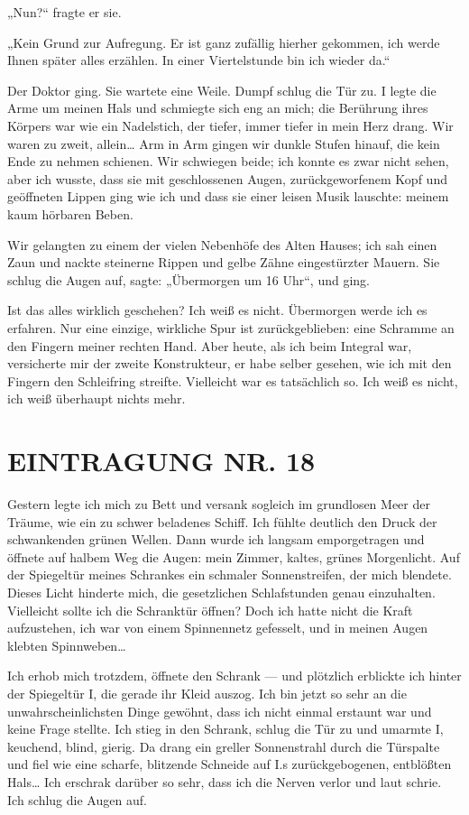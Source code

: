 „Nun?“ fragte er sie.

„Kein Grund zur Aufregung. Er ist ganz zufällig hierher gekommen,
ich werde Ihnen später alles erzählen. In einer Viertelstunde bin
ich wieder da.“

Der Doktor ging. Sie wartete eine Weile. Dumpf schlug die Tür zu. I
legte die Arme um meinen Hals und schmiegte sich eng an mich; die
Berührung ihres Körpers war wie ein Nadelstich, der tiefer, immer
tiefer in mein Herz drang. Wir waren zu zweit, allein\ldots{} Arm in Arm
gingen wir dunkle Stufen hinauf, die kein Ende zu nehmen schienen.
Wir schwiegen beide; ich konnte es zwar nicht sehen, aber ich
wusste, dass sie mit geschlossenen Augen, zurückgeworfenem Kopf und
geöffneten Lippen ging wie ich und dass sie einer leisen Musik
lauschte: meinem kaum hörbaren Beben.

Wir gelangten zu einem der vielen Nebenhöfe des Alten Hauses; ich
sah einen Zaun und nackte steinerne Rippen und gelbe Zähne
eingestürzter Mauern. Sie schlug die Augen auf, sagte: „Übermorgen
um 16 Uhr“, und ging.

Ist das alles wirklich geschehen? Ich weiß es
nicht. Übermorgen werde ich es erfahren. Nur eine einzige,
wirkliche Spur ist zurückgeblieben: eine Schramme an den Fingern
meiner rechten Hand. Aber heute, als ich beim Integral war,
versicherte mir der zweite Konstrukteur, er habe selber gesehen,
wie ich mit den Fingern den Schleifring streifte. Vielleicht war es
tatsächlich so. Ich weiß es nicht, ich weiß überhaupt nichts mehr.

\section{EINTRAGUNG NR. 18}

Gestern legte ich mich zu Bett und versank sogleich im grundlosen
Meer der Träume, wie ein zu schwer beladenes Schiff. Ich fühlte
deutlich den Druck der schwankenden grünen Wellen. Dann wurde ich
langsam emporgetragen und öffnete auf halbem Weg die Augen: mein
Zimmer, kaltes, grünes Morgenlicht. Auf der Spiegeltür meines
Schrankes ein schmaler Sonnenstreifen, der mich blendete. Dieses
Licht hinderte mich, die gesetzlichen Schlafstunden genau
einzuhalten. Vielleicht sollte ich die Schranktür öffnen? Doch ich
hatte nicht die Kraft aufzustehen, ich war von einem Spinnennetz
gefesselt, und in meinen Augen klebten Spinnweben\ldots{}

Ich erhob mich trotzdem, öffnete den Schrank — und plötzlich
erblickte ich hinter der Spiegeltür I, die gerade
ihr Kleid auszog. Ich bin jetzt so sehr an die unwahrscheinlichsten
Dinge gewöhnt, dass ich nicht einmal erstaunt war und keine Frage
stellte. Ich stieg in den Schrank, schlug die Tür zu und umarmte I,
keuchend, blind, gierig. Da drang ein greller Sonnenstrahl durch
die Türspalte und fiel wie eine scharfe, blitzende Schneide auf I.s %
zurückgebogenen, entblößten Hals\ldots{} Ich erschrak darüber so sehr,
dass ich die Nerven verlor und laut schrie. Ich schlug die Augen
auf.

